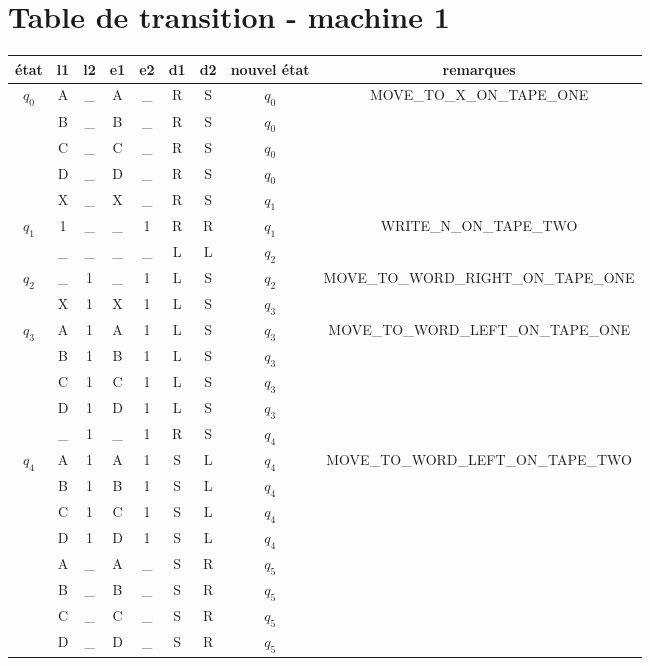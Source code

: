 \chapter{Table de transition - machine 1}
\begin{table}
  \begin{longtable}{| c | c c | c c | c c | c | c |}
    \hline
    état & l1 & l2 & e1 & e2 & d1 & d2 & nouvel état & remarques \\
    \hline
    $q_0$ & A & \_ & A & \_ & R & S & $q_0$ & MOVE\_TO\_X\_ON\_TAPE\_ONE \\
         & B & \_ & B & \_ & R & S & $q_0$ & \\
         & C & \_ & C & \_ & R & S & $q_0$ & \\
         & D & \_ & D & \_ & R & S & $q_0$ & \\
         & X & \_ & X & \_ & R & S & $q_1$ & \\
    \hline 
    $q_1$ & 1 & \_ & \_ & 1 & R & R & $q_1$ & WRITE\_N\_ON\_TAPE\_TWO \\
         & \_ & \_ & \_ & \_ & L & L & $q_2$ & \\
    \hline
    $q_2$ & \_ & 1 & \_ & 1 & L & S & $q_2$ & MOVE\_TO\_WORD\_RIGHT\_ON\_TAPE\_ONE \\
         & X & 1 & X & 1 & L & S & $q_3$ & \\
    \hline
    $q_3$ & A & 1 & A & 1 & L & S & $q_3$ & MOVE\_TO\_WORD\_LEFT\_ON\_TAPE\_ONE \\
         & B & 1 & B & 1 & L & S & $q_3$ & \\
         & C & 1 & C & 1 & L & S & $q_3$ & \\
         & D & 1 & D & 1 & L & S & $q_3$ & \\
         & \_ & 1 & \_ & 1 & R & S & $q_4$ & \\
    \hline
    $q_4$ & A & 1 & A & 1 & S & L & $q_4$ & MOVE\_TO\_WORD\_LEFT\_ON\_TAPE\_TWO \\
         & B & 1 & B & 1 & S & L & $q_4$ & \\
         & C & 1 & C & 1 & S & L & $q_4$ & \\
         & D & 1 & D & 1 & S & L & $q_4$ & \\
         & A & \_ & A & \_ & S & R & $q_5$ & \\
         & B & \_ & B & \_ & S & R & $q_5$ & \\
         & C & \_ & C & \_ & S & R & $q_5$ & \\
         & D & \_ & D & \_ & S & R & $q_5$ & \\

\end{longtable}
\end{table}
